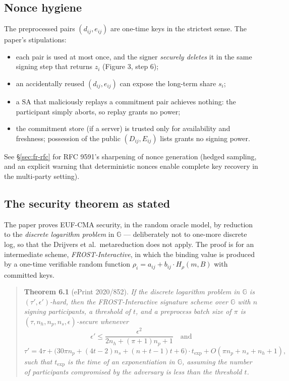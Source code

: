\documentclass[11pt,a4paper]{article}
\theoremstyle{definition}
\newcommand{\G}{\mathbb{G}}
\begin{document}
\subsection{Nonce hygiene}\label{sec:fr-nonces}

The preprocessed pairs $(d_{ij}, e_{ij})$ are one-time keys in the
strictest sense. The paper's stipulations:
\begin{itemize}
\item each pair is used at most once, and the signer \emph{securely
  deletes} it in the same signing step that returns $z_i$ (Figure 3,
  step 6);
\item an accidentally reused $(d_{ij}, e_{ij})$ can expose the long-term
  share $s_i$;
\item a $\mathrm{SA}$ that maliciously replays a commitment pair achieves
  nothing: the participant simply aborts, so replay grants no power;
\item the commitment store (if a server) is trusted only for availability
  and freshness; possession of the public $(D_{ij}, E_{ij})$ lists grants
  no signing power.
\end{itemize}
See \S\ref{sec:fr-rfc} for RFC 9591's sharpening of nonce generation
(hedged sampling, and an explicit warning that deterministic nonces enable
complete key recovery in the multi-party setting).

\subsection{The security theorem as stated}\label{sec:fr-security}

The paper proves EUF-CMA security, in the random oracle model, by
reduction to the \emph{discrete logarithm problem} in $\G$ ---
deliberately not to one-more discrete log, so that the Drijvers et al.\
metareduction does not apply. The proof is for an intermediate scheme,
\emph{FROST-Interactive}, in which the binding value is produced by a
one-time verifiable random function
$\rho_i = a_{ij} + b_{ij} \cdot H_\rho(m, B)$ with committed keys.

\begin{quotation}
\noindent\textbf{Theorem 6.1} (ePrint 2020/852). \emph{If the discrete
logarithm problem in $\G$ is $(\tau', \epsilon')$-hard, then the
FROST-Interactive signature scheme over $\G$ with $n$ signing
participants, a threshold of $t$, and a preprocess batch size of $\pi$ is
$(\tau, n_h, n_p, n_s, \epsilon)$-secure whenever}
\[
\epsilon' \le \frac{\epsilon^2}{2 n_h + (\pi + 1) n_p + 1}
\quad \text{and}
\]
\[
\tau' = 4\tau + \bigl(30 \pi n_p + (4t - 2) n_s + (n + t - 1) t + 6\bigr)
\cdot t_{\mathrm{exp}} + O(\pi n_p + n_s + n_h + 1),
\]
\emph{such that $t_{\mathrm{exp}}$ is the time of an exponentiation in
$\G$, assuming the number of participants compromised by the adversary is
less than the threshold $t$.}
\end{quotation}
\end{document}
